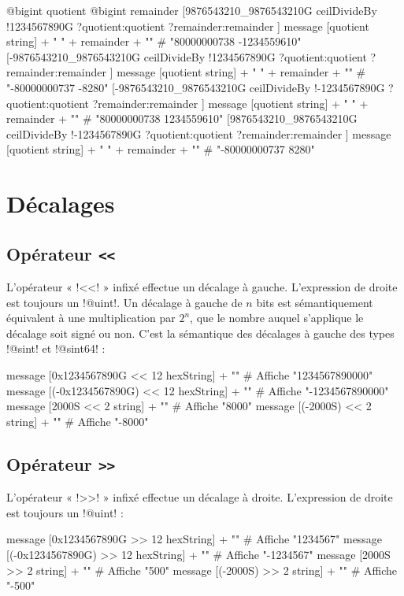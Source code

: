 \begin{galgas}
  @bigint quotient
  @bigint remainder
  [9876543210_9876543210G ceilDivideBy
    !1234567890G
    ?quotient:quotient
    ?remainder:remainder
  ]
  message [quotient string] + " " + remainder + "\n" # "80000000738 -1234559610"
  [-9876543210_9876543210G ceilDivideBy
    !1234567890G
    ?quotient:quotient
    ?remainder:remainder
  ]
  message [quotient string] + " " + remainder + "\n" # "-80000000737 -8280"
  [-9876543210_9876543210G ceilDivideBy
    !-1234567890G
    ?quotient:quotient
    ?remainder:remainder
  ]
  message [quotient string] + " " + remainder + "\n" # "80000000738 1234559610"
  [9876543210_9876543210G ceilDivideBy
    !-1234567890G
    ?quotient:quotient
    ?remainder:remainder
  ]
  message [quotient string] + " " + remainder + "\n" # "-80000000737 8280"
\end{galgas}








\section{Décalages}

\subsection{Opérateur \texttt{<{}<}}

L'opérateur « \ggs!<<! » infixé effectue un décalage à gauche. L'expression de droite est toujours un \ggs!@uint!. Un décalage à gauche de $n$ bits est sémantiquement équivalent à une multiplication par $2^n$, que le nombre auquel s'applique le décalage soit signé ou non. C'est la sémantique des décalages à gauche des types \ggs!@sint! et \ggs!@sint64! :

\begin{galgas}
  message [0x1234567890G << 12 hexString] + "\n" # Affiche "1234567890000"
  message [(-0x1234567890G) << 12 hexString] + "\n" # Affiche "-1234567890000"
  message [2000S << 2 string] + "\n" # Affiche "8000"
  message [(-2000S) << 2 string] + "\n" # Affiche "-8000"
\end{galgas}

\subsection{Opérateur \texttt{>{}>}}

L'opérateur « \ggs!>>! » infixé effectue un décalage à droite. L'expression de droite est toujours un \ggs!@uint! :
\begin{galgas}
  message [0x1234567890G >> 12 hexString] + "\n" # Affiche "1234567"
  message [(-0x1234567890G) >> 12 hexString] + "\n" # Affiche "-1234567"
  message [2000S >> 2 string] + "\n" # Affiche "500"
  message [(-2000S) >> 2 string] + "\n" # Affiche "-500"
\end{galgas}

